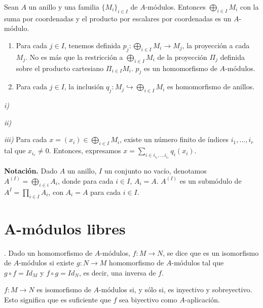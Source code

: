 \documentclass[../main.tex]{subfiles}
\begin{document}
\begin{proposition}
  Sean $A$ un anillo y una familia $\{M_i\}_{i\in I}$ de $A$-módulos. Entonces $\bigoplus_{i\in I}M_i$ con la suma por coordenadas y el producto por escalares por coordenadas es un $A$-módulo.
\end{proposition}

\begin{remark}
  \begin{enumerate}
    \item Para cada $j\in I$, tenemos definida $p_j:\bigoplus_{i\in I}M_i\rightarrow M_j$, la proyección a cada $M_j$. No es más que la restricción a $\bigoplus_{i\in I}M_i$ de la proyección $\Pi_j$ definida sobre el producto cartesiano $\Pi_{i\in I}M_i$. $p_j$ es un homomorfismo de $A$-módulos.
    \item Para cada $j\in I$, la inclusión $q_j:M_j \hookrightarrow \bigoplus_{i\in I}M_i$ es homomorfismo de anillos.
  \end{enumerate}
\end{remark}
 \textit{\textit{i})}

\textit{ii)}

\textit{iii)} Para cada $x=(x_i)\in \bigoplus_{i\in I}M_i$, existe un número finito de índices $i_1,...,i_r$ tal que $x_{i_r}\neq 0$. Entonces, expresamos $x=\sum_{i\in {i_{i_1},...i_{i_r}}} q_i(x_i)$.

\textbf{Notación.} Dado $A$ un anillo, $I$ un conjunto no vacío, denotamos $A^{(I)}=\bigoplus_{i\in i} A_i$, donde para cada $i\in I$, $A_i=A$. $A^{(I)}$ es un submódulo de $A^{I} = \prod_{i\in I} A_i$, con $A_i=A$ para cada $i\in I$.

\section{A-módulos libres}

\begin{definition}. Dado un homomorfismo de $A$-módulos, $f:M\rightarrow N$, se dice que es un isomorfismo de $A$-módulos si existe $g:N\rightarrow M$ homomorfismo de $A$-módulos tal que $g\circ f = Id_M$ y $f\circ g = Id_N$, es decir, una inversa de $f$.
\end{definition}

\begin{remark} $f:M\longrightarrow N$ es isomorfismo de $A$-módulos si, y sólo si, es inyectivo y sobreyectivo. Esto significa que es suficiente que $f$ sea biyectivo como $A$-aplicación.
\end{remark}
\end{document}
